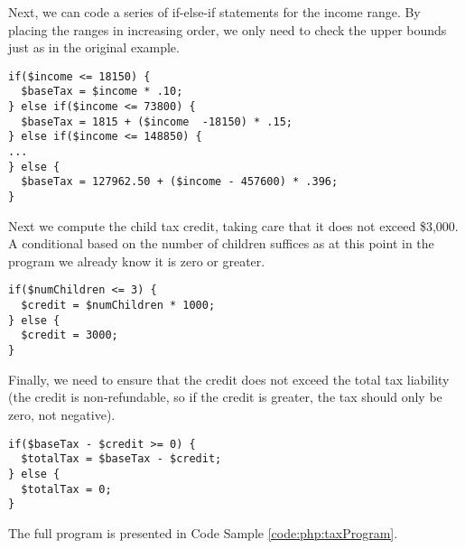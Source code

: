 Next, we can code a series of if-else-if statements for the income range.  By
placing the ranges in increasing order, we only need to check the upper bounds
just as in the original example.

\begin{verbatim}
if($income <= 18150) {
  $baseTax = $income * .10;
} else if($income <= 73800) {
  $baseTax = 1815 + ($income  -18150) * .15;
} else if($income <= 148850) {
...
} else {
  $baseTax = 127962.50 + ($income - 457600) * .396;
}
\end{verbatim}

Next we compute the child tax credit, taking care that it does
not exceed \$3,000.  A conditional based on the number of children
suffices as at this point in the program we already know it is
zero or greater.

\begin{verbatim}
if($numChildren <= 3) {
  $credit = $numChildren * 1000;
} else {
  $credit = 3000;
}
\end{verbatim}

Finally, we need to ensure that the credit does not exceed the total tax
liability (the credit is non-refundable, so if the credit is greater, the tax
should only be zero, not negative).  

\begin{verbatim}
if($baseTax - $credit >= 0) {
  $totalTax = $baseTax - $credit;
} else {
  $totalTax = 0;
}
\end{verbatim}

The full program is presented in Code Sample \ref{code:php:taxProgram}.

